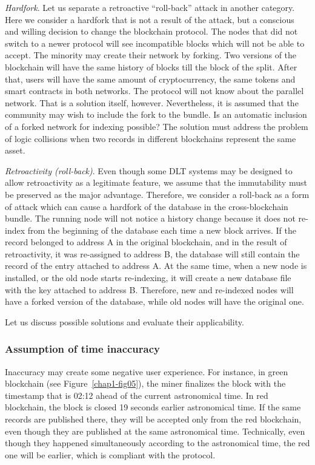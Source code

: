 \begin{multicols}{2}
\textit{Hardfork}. Let us separate a retroactive “roll-back” attack in another category. Here we consider a hardfork that is not a result of the attack, but a conscious and willing decision to change the blockchain protocol. The nodes that did not switch to a newer protocol will see incompatible blocks which will not be able to accept. The minority may create their network by forking. Two versions of the blockchain will have the same history of blocks till the block of the split. After that, users will have the same amount of cryptocurrency, the same tokens and smart contracts in both networks. The protocol will not know about the parallel network. That is a solution itself, however. Nevertheless, it is assumed that the community may wish to include the fork to the bundle. Is an automatic inclusion of a forked network for indexing possible? The solution must address the problem of logic collisions when two records in different blockchains represent the same asset.

\textit{Retroactivity (roll-back)}. Even though some DLT systems may be designed to allow retroactivity as a legitimate feature, we assume that the immutability must be preserved as the major advantage. Therefore, we consider a roll-back as a form of attack which can cause a hardfork of the database in the cross-blockchain bundle. The running node will not notice a history change because it does not re-index from the beginning of the database each time a new block arrives. If the record belonged to address A in the original blockchain, and in the result of retroactivity, it was re-assigned to address B, the database will still contain the record of the entry attached to address A. At the same time, when a new node is installed, or the old node starts re-indexing, it will create a new database file with the key attached to address B. Therefore, new and re-indexed nodes will have a forked version of the database, while old nodes will have the original one.

Let us discuss possible solutions and evaluate their applicability.

\vspace{-.3cm}

\subsubsection{Assumption of time inaccuracy}\label{subsubsec-4.3.b}

\vspace{-.5cm}

Inaccuracy may create some negative user experience. For instance, in green blockchain (see Figure~\ref{chap1-fig05}), the miner finalizes the block with the timestamp that is 02:12 ahead of the current astronomical time. In red blockchain, the block is closed 19 seconds earlier astronomical time. If the same records are published there, they will be accepted only from the red blockchain, even though they are published at the same astronomical time. Technically, even though they happened simultaneously according to the astronomical time, the red one will be earlier, which is compliant with the protocol.
\end{multicols}
